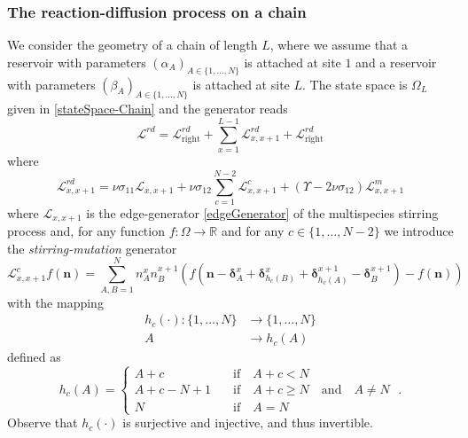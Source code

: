 \documentclass[10pt]{article}
\numberwithin{equation}{section}
\numberwithin{equation}{subsection}
\newcommand{\dt}{\;.}
\begin{document}
\subsubsection{The reaction-diffusion process on a chain}
We consider the geometry of a chain of length $L$, where we assume that a reservoir with parameters $(\alpha_{A})_{A\in\{1,\ldots,N\}}$ is attached at site $1$ and a reservoir with parameters $(\beta_{A})_{A\in\{1,\ldots,N\}}$ is attached at site $L$. The state space is $\Omega_{L}$ given in \eqref{stateSpace-Chain} and the generator reads
\begin{equation}\label{RDGenerator}
	\mathcal{L}^{rd}=\mathcal{L}_{\text{right}}^{rd}+\sum_{x=1}^{L-1}\mathcal{L}_{x,x+1}^{rd}+\mathcal{L}_{\text{right}}^{rd}
\end{equation}
where
\begin{equation}\label{edgeGeneratorRD}
	\mathcal{L}_{x,x+1}^{rd}=\nu \sigma_{11}\mathcal{L}_{x,x+1}+\nu \sigma_{12}\sum_{c=1}^{N-2}\mathcal{L}_{x,x+1}^{c}+(\Upsilon-2\nu\sigma_{12})\mathcal{L}_{x,x+1}^{m}
\end{equation}
where $\mathcal{L}_{x,x+1}$ is the edge-generator \eqref{edgeGenerator} of the multispecies stirring process and, for any function $f:\Omega\to \mathbb{R}$ and for any $c\in \{1,\ldots,N-2\}$ we introduce the \textit{stirring-mutation} generator
\begin{equation}
	\mathcal{L}_{x,x+1}^{c}f(\bm{n})=\sum_{A,B=1}^{N}n_{A}^{x}n_{B}^{x+1}\left(f(\bm{n}-\bm{\delta}_{A}^{x}+\bm{\delta}_{h_{c}(B)}^{x}+\bm{\delta}_{h_{c}(A)}^{x+1}-\bm{\delta}_{B}^{x+1})-f(\bm{n})\right)
\end{equation}
with the mapping 
\begin{equation}
	\begin{split}
		h_{c}(\cdot):\{1,\ldots,N\}&\to\{1,\ldots,N\}\\
		A&\to h_{c}(A)
	\end{split}
\end{equation}
defined as
\begin{equation}
	h_{c}(A)=\begin{cases}
		A+c \quad &\text{if}\quad A+c< N \\
		A+c-N+1\quad &\text{if}\quad A+c\geq N\quad \text{and}\quad A\neq N\\
		N\quad &\text{if}\quad A=N
	\end{cases}\dt
\end{equation}
Observe that $h_{c}(\cdot)$ is surjective and injective, and thus invertible. 
\end{document}
